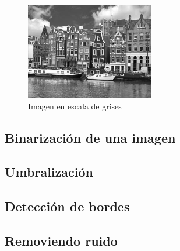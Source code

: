 \begin{figure}[htbp]
    \centering
    \includegraphics[width=0.5\textwidth]{src/img/ch7/holland_gris.png}
    \caption{Imagen en escala de grises}
    \label{fig:holland_gris}
\end{figure}

\subsection{Binarización de una imagen}

\subsection{Umbralización}\label{umbralizaciuxf3n}

\subsection{Detección de bordes}\label{detecciuxf3n-de-bordes}

\subsection{Removiendo ruido}\label{removiendo-ruido}